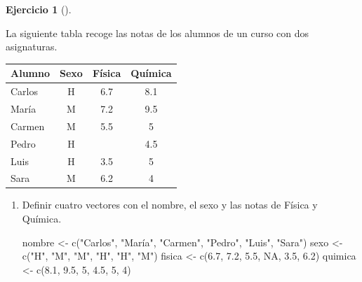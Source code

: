 \documentclass[
  a4paper,
]{scrreport}
\newenvironment{Shaded}{\begin{snugshade}}{\end{snugshade}}
\newcommand{\ConstantTok}[1]{\textcolor[rgb]{0.56,0.35,0.01}{#1}}
\newcommand{\DecValTok}[1]{\textcolor[rgb]{0.68,0.00,0.00}{#1}}
\newcommand{\FloatTok}[1]{\textcolor[rgb]{0.68,0.00,0.00}{#1}}
\newcommand{\FunctionTok}[1]{\textcolor[rgb]{0.28,0.35,0.67}{#1}}
\newcommand{\NormalTok}[1]{\textcolor[rgb]{0.00,0.23,0.31}{#1}}
\newcommand{\OtherTok}[1]{\textcolor[rgb]{0.00,0.23,0.31}{#1}}
\newcommand{\StringTok}[1]{\textcolor[rgb]{0.13,0.47,0.30}{#1}}
\theoremstyle{definition}
\newtheorem{exercise}{Ejercicio}[chapter]
\theoremstyle{remark}
\begin{document}
\begin{exercise}[]\protect\hypertarget{exr-preprocesaimento-5}{}\label{exr-preprocesaimento-5}

La siguiente tabla recoge las notas de los alumnos de un curso con dos
asignaturas.

\begin{longtable}[]{@{}lccc@{}}
\toprule\noalign{}
Alumno & Sexo & Física & Química \\
\midrule\noalign{}
\endhead
\bottomrule\noalign{}
\endlastfoot
Carlos & H & 6.7 & 8.1 \\
María & M & 7.2 & 9.5 \\
Carmen & M & 5.5 & 5 \\
Pedro & H & & 4.5 \\
Luis & H & 3.5 & 5 \\
Sara & M & 6.2 & 4 \\
\end{longtable}

\begin{enumerate}
\def\labelenumi{\alph{enumi}.}
\item
  Definir cuatro vectores con el nombre, el sexo y las notas de Física y
  Química.

  \begin{tcolorbox}[enhanced jigsaw, coltitle=black, left=2mm, colback=white, leftrule=.75mm, toptitle=1mm, breakable, bottomrule=.15mm, titlerule=0mm, bottomtitle=1mm, title=\textcolor{quarto-callout-tip-color}{\faLightbulb}\hspace{0.5em}{Solución}, arc=.35mm, toprule=.15mm, rightrule=.15mm, colframe=quarto-callout-tip-color-frame, opacityback=0, colbacktitle=quarto-callout-tip-color!10!white, opacitybacktitle=0.6]

\begin{Shaded}
\begin{Highlighting}[]
\NormalTok{nombre }\OtherTok{\textless{}{-}} \FunctionTok{c}\NormalTok{(}\StringTok{"Carlos"}\NormalTok{, }\StringTok{"María"}\NormalTok{, }\StringTok{"Carmen"}\NormalTok{, }\StringTok{"Pedro"}\NormalTok{, }\StringTok{"Luis"}\NormalTok{, }\StringTok{"Sara"}\NormalTok{)}
\NormalTok{sexo }\OtherTok{\textless{}{-}} \FunctionTok{c}\NormalTok{(}\StringTok{"H"}\NormalTok{, }\StringTok{"M"}\NormalTok{, }\StringTok{"M"}\NormalTok{, }\StringTok{"H"}\NormalTok{, }\StringTok{"H"}\NormalTok{, }\StringTok{"M"}\NormalTok{)}
\NormalTok{fisica }\OtherTok{\textless{}{-}} \FunctionTok{c}\NormalTok{(}\FloatTok{6.7}\NormalTok{, }\FloatTok{7.2}\NormalTok{, }\FloatTok{5.5}\NormalTok{, }\ConstantTok{NA}\NormalTok{, }\FloatTok{3.5}\NormalTok{, }\FloatTok{6.2}\NormalTok{)}
\NormalTok{quimica }\OtherTok{\textless{}{-}} \FunctionTok{c}\NormalTok{(}\FloatTok{8.1}\NormalTok{, }\FloatTok{9.5}\NormalTok{, }\DecValTok{5}\NormalTok{, }\FloatTok{4.5}\NormalTok{, }\DecValTok{5}\NormalTok{, }\DecValTok{4}\NormalTok{)}
\end{Highlighting}
\end{Shaded}


\end{tcolorbox}
\end{enumerate}
\end{exercise}
\end{document}
